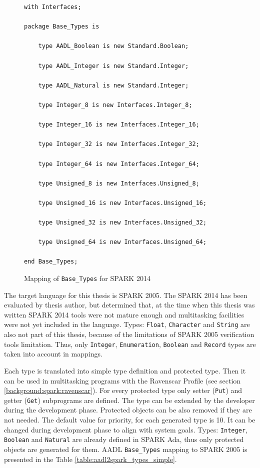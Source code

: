 \begin{figure}%
\singlespacing
\begin{lstlisting}[language=aadl, frame=single, gobble=0]
with Interfaces;

package Base_Types is

	type AADL_Boolean is new Standard.Boolean;

	type AADL_Integer is new Standard.Integer;

	type AADL_Natural is new Standard.Integer;

 	type Integer_8 is new Interfaces.Integer_8;

 	type Integer_16 is new Interfaces.Integer_16;

	type Integer_32 is new Interfaces.Integer_32;

	type Integer_64 is new Interfaces.Integer_64;

	type Unsigned_8 is new Interfaces.Unsigned_8;

	type Unsigned_16 is new Interfaces.Unsigned_16;

	type Unsigned_32 is new Interfaces.Unsigned_32;

	type Unsigned_64 is new Interfaces.Unsigned_64;	

end Base_Types;
\end{lstlisting} 
\doublespacing
\caption{Mapping of \lstinline{Base_Types} for SPARK 2014}
\label{listing:aadl2spark2014_base_types_mapping}
\end{figure}

The target language for this thesis is SPARK 2005. The SPARK 2014 has been evaluated by thesis author, but determined that, at the time when this thesis was written SPARK 2014 tools were not mature enough and multitasking facilities were not yet included in the language. Types: \lstinline{Float}, \lstinline{Character} and \lstinline{String} are also not part of this thesis, because of the limitations of SPARK 2005 verification tools limitation. Thus, only \lstinline{Integer}, \lstinline{Enumeration}, \lstinline{Boolean} and \lstinline{Record} types are taken into account in mappings.

Each type is translated into simple type definition and protected type. Then it can be used in multitasking programs with the Ravenscar Profile (see section \ref{background:spark:ravenscar}). For every protected type only setter (\lstinline{Put}) and getter (\lstinline{Get}) subprograms are defined. The type can be extended by the developer during the development phase. Protected objects can be also removed if they are not needed. The default value for priority, for each generated type is 10. It can be changed during development phase to align with system goals. Types: \lstinline{Integer}, \lstinline{Boolean} and \lstinline{Natural} are already defined in SPARK Ada, thus only protected objects are generated for them. AADL \lstinline{Base_Types} mapping to SPARK 2005 is presented in the Table \ref{table:aadl2spark_types_simple}.

